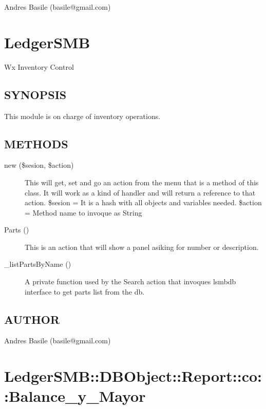 \begin{description}
Andres Basile (basile@gmail.com)

\section{LedgerSMB\label{LedgerSMB}}


Wx Inventory Control

\subsection*{SYNOPSIS\label{LedgerSMB_SYNOPSIS}}


This module is on charge of inventory operations.

\subsection*{METHODS\label{LedgerSMB_METHODS}}
\begin{description}

\item[{new (\$sesion, \$action)}] \mbox{}

This will get, set and go an action from the menu that is a method of this class. It will
work as a kind of handler and will return a reference to that action.
\$sesion = It is a hash with all objects and variables needed.
\$action = Method name to invoque as String


\item[{Parts ()}] \mbox{}

This is an action that will show a panel asiking for number or description.


\item[{\_listPartsByName ()}] \mbox{}

A private function used by the Search action that invoques lsmbdb interface to get parts list from the db.

\end{description}
\subsection*{AUTHOR\label{LedgerSMB_AUTHOR}}


Andres Basile (basile@gmail.com)

\section{LedgerSMB::DBObject::Report::co::Balance\_y\_Mayor\label{LedgerSMB::DBObject::Report::co::Balance_y_Mayor}}



\end{description}
